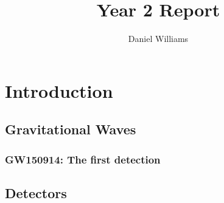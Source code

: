 \documentclass[openleft]{kentigern}
\title{Year 2 Report}
\author{Daniel Williams}
\theoremstyle{definition}
\begin{document}

\begin{titlepage}
\thispagestyle{empty}

\maketitle
\restoregeometry
\end{titlepage}

\newpage
%

\newpage
%


\part{Introduction}
\label{part:intro}


 \chapter{Gravitational Waves}
 \label{cha:grav-waves}




% 

\section{GW150914: The first detection}
\label{sec:gw150914:-first-dete}



 \chapter{Detectors}
 \label{cha:detectors}
\end{document}
